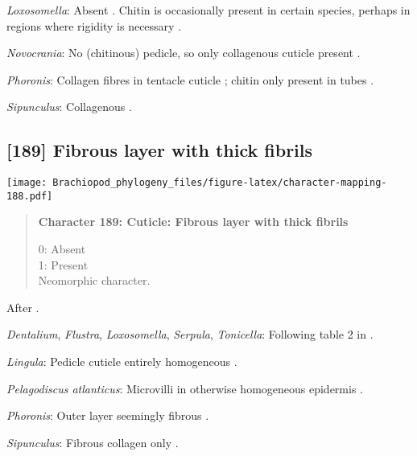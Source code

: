 \documentclass[openany]{book}
\theoremstyle{definition}
\theoremstyle{definition}
\theoremstyle{definition}
\theoremstyle{remark}
\begin{document}
\hypertarget{Loxosomella-coding-188}{}
\emph{Loxosomella}: Absent \citep{Haszprunar2008}. Chitin is
occasionally present in certain species, perhaps in regions where
rigidity is necessary \citep{Borisanova2015}.

\hypertarget{Novocrania-coding-188}{}
\emph{Novocrania}: No (chitinous) pedicle, so only collagenous cuticle
present \citep{Williams1997Introduction}.

\hypertarget{Phoronis-coding-188}{}
\emph{Phoronis}: Collagen fibres in tentacle cuticle
\citep{Bartolomaeus2001U}; chitin only present in tubes
\citep{Jeuniaux1971}.

\hypertarget{Sipunculus-coding-188}{}
\emph{Sipunculus}: Collagenous \citep{Goffinet1978}.

\subsection*{{[}189{]} Fibrous layer with thick
fibrils}\label{fibrous-layer-with-thick-fibrils}

\texttt{[image: Brachiopod\_phylogeny\_files/figure-latex/character-mapping-188.pdf]}

\begin{quote}
\textbf{Character 189: Cuticle: Fibrous layer with thick fibrils}

0: Absent\\
1: Present\\
Neomorphic character.
\end{quote}

After \citet{Borisanova2015}.

\hypertarget{Dentalium-coding-189}{}
\emph{Dentalium}, \emph{Flustra}, \emph{Loxosomella}, \emph{Serpula},
\emph{Tonicella}: Following table 2 in \citet{Borisanova2015}.

\hypertarget{Lingula-coding-189}{}
\emph{Lingula}: Pedicle cuticle entirely homogeneous
\citep{Williams1997Introduction}.

\hypertarget{Pelagodiscus_atlanticus-coding-189}{}
\emph{Pelagodiscus atlanticus}: Microvilli in otherwise homogeneous
epidermis \citep{Williams1997Introduction}.

\hypertarget{Phoronis-coding-189}{}
\emph{Phoronis}: Outer layer seemingly fibrous \citep{BereiterHahn1984}.

\hypertarget{Sipunculus-coding-189}{}
\emph{Sipunculus}: Fibrous collagen only \citep{BereiterHahn1984}.
\end{document}
